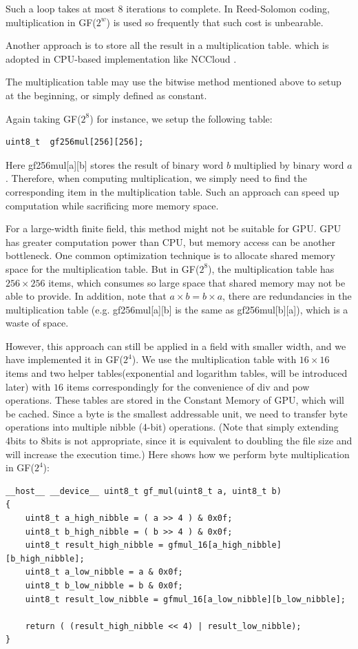 \documentclass[a4paper]{article}
\begin{document}
Such a loop takes at most 8 iterations to complete.
In Reed-Solomon coding, multiplication in GF($2^w$) is used so frequently that such cost is unbearable.


Another approach is to store all the result in a multiplication table.
which is adopted in CPU-based implementation 
like NCCloud \cite{hu2012nccloud}.

The multiplication table may use 
the bitwise method
mentioned above 
to setup at the beginning, or simply defined as constant. 

Again taking GF($2^8$) for instance, we setup the following table:
\begin{verbatim}
uint8_t  gf256mul[256][256];
\end{verbatim}
Here gf256mul[a][b] stores the result of binary word $b$ multiplied by binary word $a$.
Therefore, when computing multiplication, we simply need to find the corresponding item in the multiplication table.
Such an approach can speed up computation while sacrificing more memory space.

For a large-width finite field, 
this method might not be suitable for GPU.
GPU has greater computation power than CPU, but memory access can be another bottleneck. One common optimization technique is to allocate shared memory space for the multiplication table.
But in GF($2^8$),
the multiplication table has $256 \times 256$ items, which consumes so large space that shared memory may not be able to provide.
In addition, note that $a \times b = b \times a$, there are redundancies in the multiplication table (e.g. gf256mul[a][b] is the same as gf256mul[b][a]), which is a waste of space.

However, this approach can still be applied in a field with smaller width,
and we have implemented it in GF($2^4$).
We use the multiplication table with $16 \times 16$ items and two helper tables(exponential and logarithm tables, will be introduced later) with $16$ items correspondingly for the convenience of div and pow operations. 
These tables are stored in the Constant Memory of GPU, which will be cached.
Since a byte is the smallest addressable unit, we need to transfer byte operations into multiple nibble (4-bit) operations.
(Note that simply extending 4bits to 8bits is not appropriate, since it is equivalent to doubling the file size and will increase the execution time.)
Here shows how we perform byte multiplication in GF($2^4$):
\begin{verbatim}
__host__ __device__ uint8_t gf_mul(uint8_t a, uint8_t b)
{
	uint8_t a_high_nibble = ( a >> 4 ) & 0x0f;
	uint8_t b_high_nibble = ( b >> 4 ) & 0x0f;
	uint8_t result_high_nibble = gfmul_16[a_high_nibble][b_high_nibble];
	uint8_t a_low_nibble = a & 0x0f;
	uint8_t b_low_nibble = b & 0x0f;
	uint8_t result_low_nibble = gfmul_16[a_low_nibble][b_low_nibble];

	return ( (result_high_nibble << 4) | result_low_nibble);
}
\end{verbatim}
\end{document}
